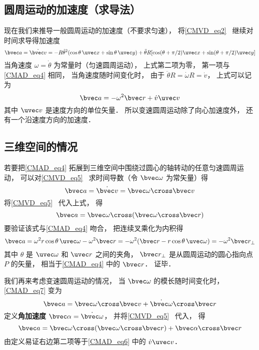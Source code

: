 \subsection{圆周运动的加速度（求导法）}
现在我们来推导一般圆周运动的加速度（不要求匀速），  将\autoref{CMVD_eq2}~ 继续对时间求导得加速度
\begin{equation}
\bvec a = \dot {\bvec v} =  - R \dot\theta^2(\cos \theta\, \uvec x + \sin \theta\, \uvec y) + \ddot\theta R [\cos(\theta + \pi/2) \uvec x + \sin(\theta + \pi/2)\uvec y]
\end{equation}
当角速度 $\omega = \dot\theta$ 为常量时（匀速圆周运动）， 上式第二项为零， 第一项与\autoref{CMAD_eq4} 相同， 当角速度随时间变化时， 由于 $\ddot\theta R = \dot\omega R = \dot v$， 上式可以记为
\begin{equation}\label{CMAD_eq6}
\bvec a = - \omega ^2 \bvec r + \dot v \uvec v
\end{equation}
其中 $\uvec v$ 是速度方向的单位矢量． 所以变速圆周运动除了向心加速度外， 还有一个沿速度方向的加速度．

\subsection{三维空间的情况}
若要把\autoref{CMAD_eq4} 拓展到三维空间中围绕过圆心的轴转动的任意匀速圆周运动， 可以对\autoref{CMVD_eq5}~ 求时间导数（令 $\bvec\omega$ 为常矢量）得
\begin{equation}\label{CMAD_eq7}
\bvec a = \dot{\bvec v} = \bvec\omega \cross \bvec v
\end{equation}
将\autoref{CMVD_eq5}~ 代入上式， 得
\begin{equation}\label{CMAD_eq9}
\bvec a =  \bvec\omega \cross (\bvec\omega \cross \bvec r)
\end{equation}
要验证该式与\autoref{CMAD_eq4} 吻合， 把连续叉乘化为内积得
\begin{equation}
\bvec a = \omega^2 r \cos\theta\, \uvec \omega - \omega^2 \bvec r = -\omega^2 (\bvec r - r\cos\theta\, \uvec\omega) = -\omega^2 \bvec r_\bot
\end{equation}
其中 $\theta$ 是 $\uvec\omega$ 和 $\uvec r$ 之间的夹角， $\bvec r_\bot$ 是从圆周运动的圆心指向点 $P$ 的矢量， 相当于\autoref{CMAD_eq4} 中的 $\bvec r$． 证毕．

我们再来考虑变速圆周运动的情况， 当 $\bvec\omega$ 的模长随时间变化时， \autoref{CMAD_eq7} 变为
\begin{equation}
\bvec a = \bvec\omega \cross \bvec v + \dot{\bvec\omega} \cross \bvec r 
\end{equation}
定义\textbf{角加速度} $\bvec\alpha = \dot{\bvec\omega}$， 并将\autoref{CMVD_eq5}~ 代入， 得
\begin{equation}
\bvec a =  \bvec\omega \cross (\bvec\omega \cross \bvec r) + \bvec\alpha\cross\bvec r
\end{equation}
由定义易证右边第二项等于\autoref{CMAD_eq6} 中的 $\dot v\uvec v$．




